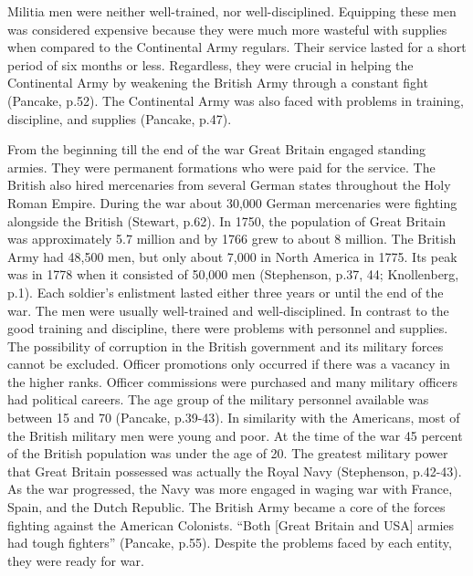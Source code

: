 Militia men were neither well-trained, nor well-disciplined.  Equipping these
men was considered expensive because they were much more wasteful with supplies
when compared to the Continental Army regulars.  Their service lasted for a
short period of six months or less. Regardless, they were crucial in helping the
Continental Army by weakening the British Army through a constant fight
(Pancake, p.52).  The Continental Army was also faced with problems in training,
discipline, and supplies (Pancake, p.47).

From the beginning till the end of the war Great Britain engaged standing
armies.  They were permanent formations who were paid for the service.  The
British also hired mercenaries from several German states throughout the Holy
Roman Empire.  During the war about 30,000 German mercenaries were fighting
alongside the British (Stewart, p.62).  In 1750, the population of Great Britain
was approximately 5.7 million and by 1766 grew to about 8 million.  The British
Army had 48,500 men, but only about 7,000 in North America in 1775.  Its peak
was in 1778 when it consisted of 50,000 men (Stephenson, p.37, 44; Knollenberg,
p.1).  Each soldier’s enlistment lasted either three years or until the end of
the war.  The men were usually well-trained and well-disciplined.  In contrast
to the good training and discipline, there were problems with personnel and
supplies.  The possibility of corruption in the British government and its
military forces cannot be excluded.  Officer promotions only occurred if there
was a vacancy in the higher ranks.  Officer commissions were purchased and many
military officers had political careers.  The age group of the military
personnel available was between 15 and 70 (Pancake, p.39-43).  In similarity
with the Americans, most of the British military men were young and poor.  At
the time of the war 45 percent of the British population was under the age of
20.  The greatest military power that Great Britain possessed was actually the
Royal Navy (Stephenson, p.42-43).  As the war progressed, the Navy was more
engaged in waging war with France, Spain, and the Dutch Republic.  The British
Army became a core of the forces fighting against the American Colonists.  “Both
[Great Britain and USA] armies had tough fighters” (Pancake, p.55). Despite the
problems faced by each entity, they were ready for war.

